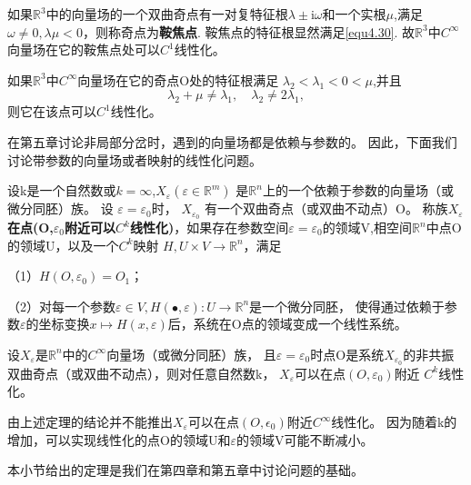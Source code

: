 \begin{example}
  如果\(\mathbb{R}^3\)中的向量场的一个双曲奇点有一对复特征根$\lambda \pm \mathrm { i } \omega$和一个实根\(\mu\),满足$\omega \neq 0 , \lambda \mu < 0$，则称奇点为\textbf{鞍焦点}.
  鞍焦点的特征根显然满足\ref{equ4.30}.
  故\(\mathbb{R}^3\)中\(C^\infty\)向量场在它的鞍焦点处可以\(C^1\)线性化。
\end{example}
\begin{example}
如果\(\mathbb{R}^3\)中\(C^\infty\)向量场在它的奇点O处的特征根满足
$ { \lambda } _ { 2 } < \lambda _ { 1 } < 0 < \mu$,并且
\[
\lambda _ { 2 } + \mu \neq \lambda _ { 1 } , \quad \lambda _ { 2 } \neq 2 \lambda _ { 1 },
\]
则它在该点可以\(C^1\)线性化。
\end{example}

在第五章讨论非局部分岔时，遇到的向量场都是依赖与参数的。
因此，下面我们讨论带参数的向量场或者映射的线性化问题。

\begin{defination}
设k是一个自然数或\(k=\infty\),$X _ { \varepsilon } \left( \varepsilon \in \mathbb { R } ^ { m } \right)$
是\(\mathbb{R}^n\)上的一个依赖于参数的向量场（或微分同胚）族。
设
\(\varepsilon=\varepsilon_0\)时，
\(X_{\varepsilon_{0}}\)
有一个双曲奇点（或双曲不动点）O。
称族\(X_\varepsilon\)\textbf{在点(O,\(\varepsilon_0\)附近可以\(C^k\)线性化)}，如果存在参数空间\(\varepsilon=\varepsilon_0\)的领域V,相空间\(\mathbb{R}^n\)中点O的领域U，以及一个\(C^k\)映射
$H , U \times V \rightarrow \mathbb { R } ^ { n }$，满足

（1）$H \left( O , \varepsilon _ { 0 } \right) = O _ { 1 }$；

（2）对每一个参数$\varepsilon \in V , H ( \bullet , \varepsilon ) : U \rightarrow \mathbb { R } ^ { n }$是一个微分同胚，
使得通过依赖于参数\(\varepsilon\)的坐标变换$x \mapsto H ( x , \varepsilon )$后，系统在O点的领域变成一个线性系统。
\end{defination}

\begin{theorem}[IY]
  设\(X_\varepsilon\)是\(\mathbb{R}^n\)中的\(C^\infty\)向量场（或微分同胚）族，
  且$\varepsilon = \varepsilon _ { 0 }$时点O是系统$X _ { \varepsilon _ { 0 } }$的非共振双曲奇点（或双曲不动点），则对任意自然数k，
  \(X_\varepsilon\)可以在点$\left( O , \varepsilon _ { 0 } \right)$附近  \(C^k\)线性化。
\end{theorem}

\begin{note}
  由上述定理的结论并不能推出\(X_\varepsilon\)可以在点$\left( O , \epsilon _ { 0 } \right)$附近\(C^\infty\)线性化。
  因为随着k的增加，可以实现线性化的点O的领域U和\(\varepsilon\)的领域V可能不断减小。
\end{note}

本小节给出的定理是我们在第四章和第五章中讨论问题的基础。
